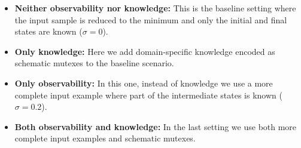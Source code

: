 \documentclass{article}
\begin{document}
\begin{itemize}
	\item \textbf{Neither observability nor knowledge:} This is the baseline setting where the input sample is reduced to the minimum and only the initial and final states are known ($\sigma = 0$).
	\item \textbf{Only knowledge:} Here we add domain-specific knowledge encoded as schematic mutexes to the baseline scenario.
	\item \textbf{Only observability:} In this one, instead of knowledge we use a more complete input example where part of the intermediate states is known ($\sigma = 0.2$).
	\item \textbf{Both observability and knowledge:} In the last setting we use both more complete input examples and schematic mutexes.
\end{itemize}
\end{document}
